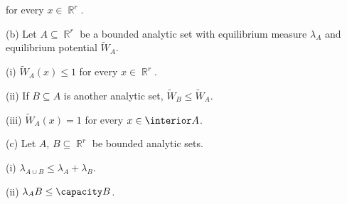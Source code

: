 
\noindent for every $x\in\BbbR^r$.

(b) Let $A\subseteq\BbbR^r$ be a bounded analytic
set with equilibrium measure $\lambda_A$ and equilibrium potential
$\tilde W_A$.

\quad(i) $\tilde W_A(x)\le 1$ for every $x\in\BbbR^r$.

\quad(ii) If $B\subseteq A$ is another analytic set,
$\tilde W_B\le\tilde W_A$.

\quad(iii) $\tilde W_A(x)=1$ for every $x\in\interior A$.

(c) Let $A$, $B\subseteq\BbbR^r$ be bounded analytic sets.

\quad(i) $\lambda_{A\cup B}\le\lambda_A+\lambda_B$.

\quad(ii) $\lambda_AB\le\capacity B$.

